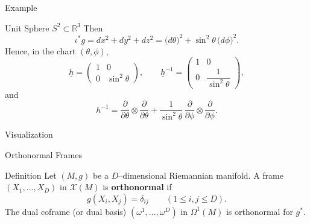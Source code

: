 \begin{frame}{Example}
\vspace{-0.2cm}
\begin{block}{Unit Sphere $S^2\subset\mathbb{R}^3$}
Then
\vspace{-0.2cm}
\[
\iota^*g=dx^2+dy^2+dz^2
=\bigl(d\theta\bigr)^2+\sin^2\theta\,\bigl(d\phi\bigr)^2.
\]
Hence, in the chart $(\theta,\phi)$,
\vspace{-0.2cm}
\[
\underline{h}=
\begin{pmatrix}
1 & 0\\[2pt]
0 & \sin^2\theta
\end{pmatrix},
\qquad
\underline{h}^{-1}=
\begin{pmatrix}
1 & 0\\[2pt]
0 & \dfrac{1}{\sin^2\theta}
\end{pmatrix},
\]
and
\vspace{-0.2cm}
\[
h^{-1}=\frac{\partial}{\partial\theta}\otimes\frac{\partial}{\partial\theta}
+\frac{1}{\sin^2\theta}\,\frac{\partial}{\partial\phi}\otimes\frac{\partial}{\partial\phi}.
\]
\vspace{-0.3cm}
\end{block}
\end{frame}

\begin{frame}{Visualization}
    \begin{center}
\end{center}
\end{frame}

\begin{frame}{Orthonormal Frames}
\begin{block}{Definition}
Let $(M,g)$ be a $D$–dimensional Riemannian manifold.
A frame $(X_1,\dots,X_D)$ in $\mathcal{X}(M)$ is \textbf{orthonormal} if
\[
g(X_i,X_j)=\delta_{ij}\qquad(1\le i,j\le D).
\]
The dual coframe (or dual basis) $(\omega^1,\dots,\omega^D)$ in $\Omega^1(M)$ is orthonormal for $g^*$.
\end{block}
\end{frame}

